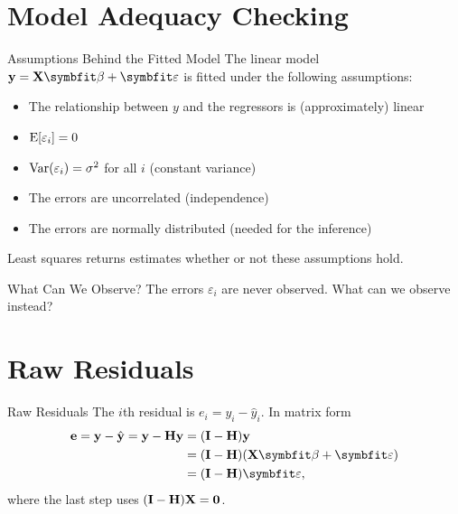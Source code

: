 \section{Model Adequacy Checking}


\begin{frame}{Assumptions Behind the Fitted Model}
    The linear model $\by=\bX\bbeta+\bvarepsilon$ is fitted under the following assumptions:
    \begin{itemize}
        \item The relationship between $y$ and the regressors is (approximately) linear
        \item $\operatorname{E}[\varepsilon_i]=0$
        \item $\operatorname{Var}(\varepsilon_i)=\sigma^2$ for all $i$ (constant variance)
        \item The errors are uncorrelated (independence)
        \item The errors are normally distributed (needed for the inference)
    \end{itemize}
    Least squares returns estimates whether or not these assumptions hold.
\end{frame}


\begin{frame}{What Can We Observe?}
    The errors $\varepsilon_i$ are never observed. What can we observe instead?

\end{frame}


\section{Raw Residuals}


\begin{frame}{Raw Residuals}
    The $i$th residual is $e_i=y_i-\hat y_i$. In matrix form
    \begin{align*}
        \be = \by-\hat{\by} = \by - \bH \by &= (\bI-\bH)\by \\
        &= (\bI-\bH)(\bX \bbeta + \bvarepsilon) \\
        &= (\bI-\bH)\bvarepsilon ,
    \end{align*}
    where the last step uses $(\mathbf{I}-\mathbf{H})\mathbf{X}=\mathbf{0}$.
\end{frame}


